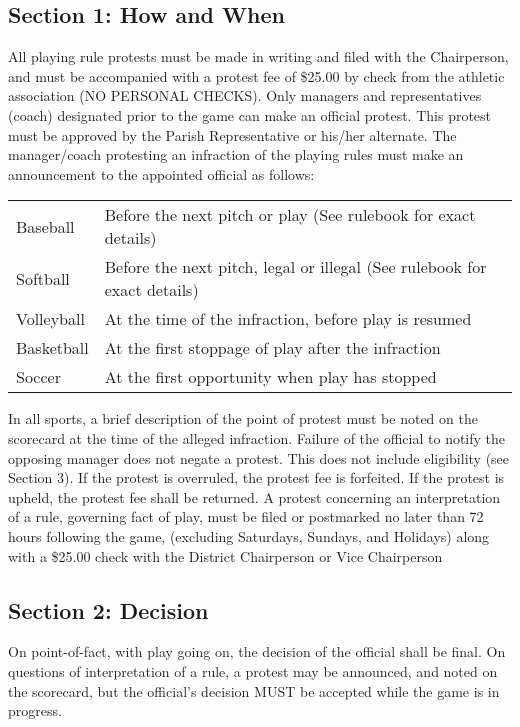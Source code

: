 \documentclass[draft]{memoir}
\begin{document}
\subsection{Section 1: How and When}
All playing rule protests must be made in writing and filed with the Chairperson, and must be accompanied with a protest fee of \$25.00 by check from the athletic association (NO PERSONAL CHECKS).  Only managers and representatives (coach) designated prior to the game can make an official protest.  This protest must be approved by the Parish Representative or his/her alternate.  The manager/coach protesting an infraction of the playing rules must make an announcement to the appointed official as follows:
\begin{center}
    \begin{tabular}{l l}
        Baseball & Before the next pitch or play (See rulebook for exact details) \\
        Softball & Before the next pitch, legal or illegal (See rulebook for exact details) \\
        Volleyball & At the time of the infraction, before play is resumed \\
        Basketball & At the first stoppage of play after the infraction \\
        Soccer & At the first opportunity when play has stopped \\
    \end{tabular}
\end{center}

In all sports, a brief description of the point of protest must be noted on the scorecard at the time of the alleged infraction.  Failure of the official to notify the opposing manager does not negate a protest.   This does not include eligibility (see Section 3).  If the protest is overruled, the protest fee is forfeited. If the protest is upheld, the protest fee shall be returned. A protest concerning an interpretation of a rule, governing fact of play, must be filed or postmarked no later than 72 hours following the game, (excluding Saturdays, Sundays, and Holidays) along with a \$25.00 check with the District Chairperson or Vice Chairperson 

\subsection{Section 2: Decision}
On point-of-fact, with play going on, the decision of the official shall be final.  On questions of interpretation of a rule, a protest may be announced, and noted on the scorecard, but the official's decision MUST be accepted while the game is in progress.
\end{document}
